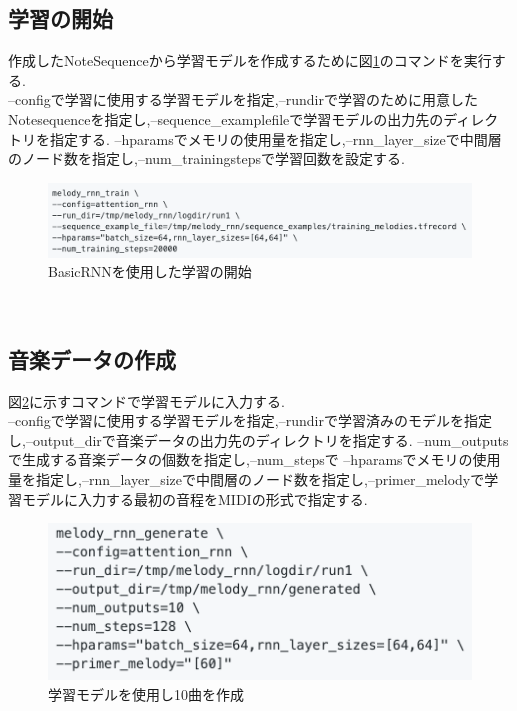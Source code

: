 \subsection{学習の開始}
作成したNoteSequenceから学習モデルを作成するために図\ref{img:BasicRNNを使用した学習の開始}のコマンドを実行する.\\
--configで学習に使用する学習モデルを指定,--rundirで学習のために用意したNotesequenceを指定し,--sequence\_examplefileで学習モデルの出力先のディレクトリを指定する.
--hparamsでメモリの使用量を指定し,--rnn\_layer\_sizeで中間層のノード数を指定し,--num\_trainingstepsで学習回数を設定する.\\
\begin{figure}[!ht]
    \begin{screen}
    \begin{center}
        \includegraphics[scale=0.5, clip]{./img/Rnn_train.png}
        \caption{BasicRNNを使用した学習の開始}
        \label{img:BasicRNNを使用した学習の開始}
    \end{center}
    \end{screen}
\end{figure}\\
\subsection{音楽データの作成}
図\ref{img:学習モデルを使用し10曲を作成}に示すコマンドで学習モデルに入力する.\\
--configで学習に使用する学習モデルを指定,--rundirで学習済みのモデルを指定し,--output\_dirで音楽データの出力先のディレクトリを指定する.
--num\_outputsで生成する音楽データの個数を指定し,--num\_stepsで
--hparamsでメモリの使用量を指定し,--rnn\_layer\_sizeで中間層のノード数を指定し,--primer\_melodyで学習モデルに入力する最初の音程をMIDIの形式で指定する.\\
\begin{figure}[!ht]
    \begin{screen}
    \begin{center}
        \includegraphics[scale=0.9, clip]{./img/MIDI_make.png}
        \caption{学習モデルを使用し10曲を作成}
        \label{img:学習モデルを使用し10曲を作成}
    \end{center}
    \end{screen}
\end{figure}\\
